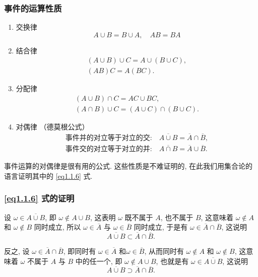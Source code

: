 \subsubsection{事件的运算性质}
\begin{enumerate}
  \item 交换律
  \begin{equation}\label{eq1.1.1}
    A \cup B = B \cup A, \quad AB = BA
  \end{equation}
  \item 结合律
  \begin{gather}
    (A \cup B) \cup C = A \cup (B \cup C),\label{eq1.1.2}\\
    (AB)C = A(BC).\label{eq:1.1.3}
  \end{gather}
  \item 分配律
  \begin{gather}
    (A \cup B) \cap C = AC \cup BC,\label{eq1.1.4}\\
    (A \cap B) \cup C = (A \cup C) \cap (B \cup C).\label{eq1.1.5}
  \end{gather}
  \item 对偶律 （德莫根公式）
  \begin{gather}
    \text{事件并的对立等于对立的交:} \quad \overline{A \cup B} = \overline{A} \cap \overline{B},\label{eq1.1.6}\\
    \text{事件交的对立等于对立的并:} \quad \overline{A \cap B} = \overline{A} \cup \overline{B}.\label{eq1.1.7}
  \end{gather}
\end{enumerate}

事件运算的对偶律是很有用的公式.
这些性质是不难证明的,
在此我们用集合论的语言证明其中的 \eqref{eq1.1.6} 式.

\subsubsection*{\eqref{eq1.1.6} 式的证明}

设 $\omega \in \overline{A \cup B}$,
即 $\omega \notin A \cup B$,
这表明 $\omega$ 既不属于 $A$,
也不属于 $B$,
这意味着 $\omega \notin A$ 和 $\omega \notin B$ 同时成立,
所以 $\omega \in \overline{A}$ 与 $\omega \in \overline{B}$ 同时成立,
于是有 $\omega \in \overline{A} \cap \overline{B}$,
这说明
\[
  \overline{A \cup B} \subset \overline{A} \cap \overline{B}.
\]

反之,
设 $\omega \in \overline{A} \cap \overline{B}$,
即同时有 $\omega \in \overline{A}$ 和$\omega \in \overline{B}$,
从而同时有 $\omega \notin A$ 和 $\omega \notin B$,
这意味着 $\omega$ 不属于 $A$ 与 $B$ 中的任一个,
即 $\omega \notin A \cup B$,
也就是有 $\omega \in \overline{A \cup B}$,
这说明
\[
  \overline{A \cup B} \supset \overline{A} \cap \overline{B}.
\]

